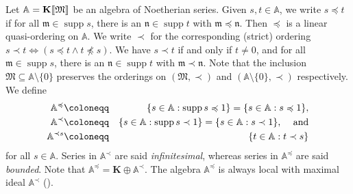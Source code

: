 \documentclass{article}
\newcommand{\assign}{\coloneqq}
\newcommand{\npreccurlyeq}{\mathrel{\not\preccurlyeq}}
\newcommand{\suchthat}{:}
\newcommand{\tmem}[1]{{\em #1\/}}
\newcommand{\tmop}[1]{\ensuremath{\operatorname{#1}}}
\newcommand{\tmstrong}[1]{\textbf{#1}}
\theoremstyle{remark}\newtheorem*{convention*}{Convention}
\begin{document}
Let $\mathbb{A}= \textbf{{\tmstrong{K}}} \llbracket \mathfrak{M} \rrbracket$
be an algebra of Noetherian series. Given $s, t \in \mathbb{A}$, we
write $s \preccurlyeq t$ if for all $\mathfrak{m} \in \tmop{supp} s$, there is an $\mathfrak{n} \in
\tmop{supp} t$ with $\mathfrak{m} \preccurlyeq \mathfrak{n}$. Then
$\preccurlyeq$ is a linear quasi-ordering on $\mathbb{A}$. We write $\prec$
for the corresponding (strict) ordering $s \prec t \Longleftrightarrow (s
\preccurlyeq t \wedge t \npreccurlyeq s)$. We have $s \prec t$ if and only if
$t \neq 0$, and for all $\mathfrak{m} \in \tmop{supp} s$, there is an
$\mathfrak{n} \in \tmop{supp} t$ with $\mathfrak{m} \prec \mathfrak{n}$. Note
that the inclusion $\mathfrak{M} \subseteq \mathbb{A} \setminus \{0\}$
preserves the orderings on $(\mathfrak{M}, \prec)$ and $(\mathbb{A} \setminus
\{0\}, \prec)$ respectively. We define\label{autolab7} \label{autolab8}
\label{autolab9}
\begin{eqnarray*}
  \mathbb{A}^{\preccurlyeq} & \assign & \{ s \in \mathbb{A} \suchthat
  \tmop{supp} s \preccurlyeq 1 \} = \{s \in \mathbb{A} \suchthat s
  \preccurlyeq 1\},\\
  \mathbb{A}^{\prec} & \assign & \{ s \in \mathbb{A} \suchthat \tmop{supp} s
  \prec 1 \} = \{ s \in \mathbb{A} \suchthat s \prec 1 \} \text{, \quad and}\\
  \mathbb{A}^{\prec s} & \assign & \{t \in \mathbb{A} \suchthat t \prec s\}
\end{eqnarray*}
for all $s \in \mathbb{A}$. Series in $\mathbb{A}^{\prec}$ are said
{\tmem{infinitesimal}}{}, whereas series in
$\mathbb{A}^{\preccurlyeq}$ are said {\tmem{bounded}}{}.
Note that $\mathbb{A}^{\preccurlyeq} = \mathbf{K} \oplus \mathbb{A}^{\prec}$.
The algebra $\mathbb{A}^{\preccurlyeq}$ is always local with maximal ideal
$\mathbb{A}^{\prec}$ ({\cite[Proposition~2.8]{BKKMP:strong}}).
\end{document}
